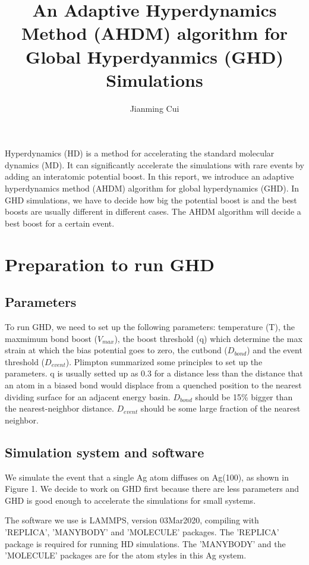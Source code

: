 \documentclass{article}
\title{An Adaptive Hyperdynamics Method (AHDM) algorithm for Global Hyperdyanmics (GHD) Simulations}
\author{Jianming Cui}
\begin{document}

\maketitle

Hyperdynamics (HD) is a method for accelerating the standard molecular dynamics (MD). It can significantly accelerate the simulations with rare events by adding an interatomic potential boost. In this report, we introduce an adaptive hyperdynamics method (AHDM) algorithm for global hyperdynamics (GHD). In GHD simulations, we have to decide how big the potential boost is and the best boosts are usually different in different cases. The AHDM algorithm will decide a best boost for a certain event.

\section{Preparation to run GHD}

\subsection{Parameters}

To run GHD, we need to set up the following parameters: temperature (T), the maxmimum bond boost ($V_{max}$), the boost threshold (q) which determine the max strain at which the bias potential goes to zero, the cutbond ($D_{bond}$) and the event threshold ($D_{event}$). Plimpton\cite{Plimpton2020} summarized some principles to set up the parameters. q is usually setted up as 0.3 for a distance less than the distance that an atom in a biased bond would displace from a quenched position to the nearest dividing surface for an adjacent energy basin. $D_{bond}$ should be 15\% bigger than the nearest-neighbor distance. $D_{event}$ should be some large fraction of the nearest neighbor.

\subsection{Simulation system and software}

We simulate the event that a single Ag atom diffuses on Ag(100), as shown in Figure 1. We decide to work on GHD first because there are less parameters and GHD is good enough to accelerate the simulations for small systems. 

The software we use is LAMMPS, version 03Mar2020, compiling with 'REPLICA', 'MANYBODY' and 'MOLECULE' packages. The 'REPLICA' package is required for running HD simulations. The 'MANYBODY' and the 'MOLECULE' packages are for the atom styles in this Ag system.
\end{document}
